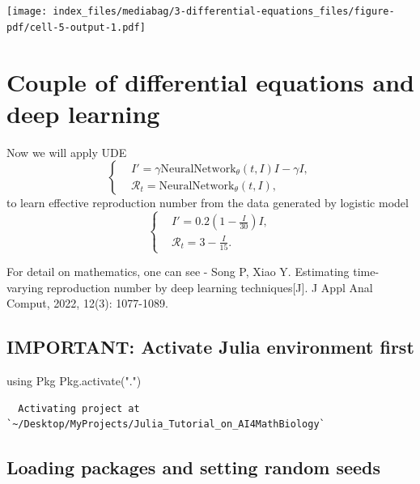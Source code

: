 \documentclass[
  letterpaper,
  DIV=11,
  numbers=noendperiod]{scrreport}
\newenvironment{Shaded}{\begin{snugshade}}{\end{snugshade}}
\newcommand{\BuiltInTok}[1]{\textcolor[rgb]{0.00,0.23,0.31}{#1}}
\newcommand{\FunctionTok}[1]{\textcolor[rgb]{0.28,0.35,0.67}{#1}}
\newcommand{\ImportTok}[1]{\textcolor[rgb]{0.00,0.46,0.62}{#1}}
\newcommand{\NormalTok}[1]{\textcolor[rgb]{0.00,0.23,0.31}{#1}}
\newcommand{\StringTok}[1]{\textcolor[rgb]{0.13,0.47,0.30}{#1}}
\begin{document}
\texttt{[image: index\_files/mediabag/3-differential-equations\_files/figure-pdf/cell-5-output-1.pdf]}


\chapter{Couple of differential equations and deep
learning}\label{couple-of-differential-equations-and-deep-learning}

Now we will apply UDE \[\left\{
\begin{aligned}
    & I' = \gamma \mathrm{NeuralNetwork}_{\theta}(t,I) I  -\gamma I,\\
    & \mathcal{R}_t = \mathrm{NeuralNetwork}_{\theta}(t,I),
\end{aligned}
\right.\] to learn effective reproduction number from the data generated
by logistic model \[
    \left\{
    \begin{aligned}
        & I' = 0.2\left(1-\frac{I}{30}\right)I,\\
        & \mathcal{R}_t = 3-\frac{I}{15}.
    \end{aligned}
    \right.
\]

For detail on mathematics, one can see - Song P, Xiao Y. Estimating
time-varying reproduction number by deep learning techniques{[}J{]}. J
Appl Anal Comput, 2022, 12(3): 1077-1089.

\section{IMPORTANT: Activate Julia environment
first}\label{important-activate-julia-environment-first-2}

\begin{Shaded}
\begin{Highlighting}[]
\ImportTok{using} \BuiltInTok{Pkg}
\BuiltInTok{Pkg}\NormalTok{.}\FunctionTok{activate}\NormalTok{(}\StringTok{"."}\NormalTok{)}
\end{Highlighting}
\end{Shaded}

\begin{verbatim}
  Activating project at `~/Desktop/MyProjects/Julia_Tutorial_on_AI4MathBiology`
\end{verbatim}

\section{Loading packages and setting random
seeds}\label{loading-packages-and-setting-random-seeds}
\end{document}
